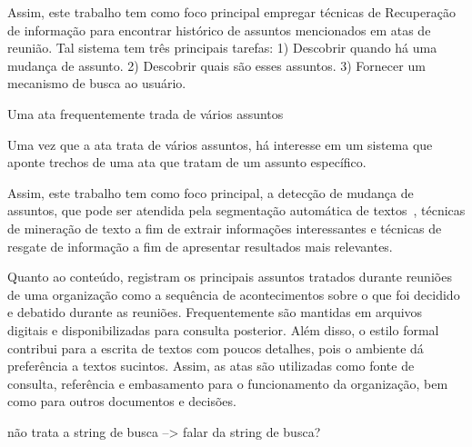 


Assim, este trabalho tem como foco principal empregar técnicas de Recuperação de informação para encontrar histórico de assuntos mencionados em atas de reunião. Tal sistema tem três principais tarefas: 
1) Descobrir quando há uma mudança de assunto. 
2) Descobrir quais são esses assuntos. 
3) Fornecer um mecanismo de busca ao usuário. 



Uma ata frequentemente trada de vários assuntos

Uma vez que a ata trata de vários assuntos, 
há interesse em um sistema que aponte trechos de uma ata que tratam de um assunto específico. 

Assim, este trabalho tem como foco principal, a detecção de mudança de assuntos, que pode ser atendida pela segmentação automática de textos~\cite{Chen2017,Naili2016,Cardoso2017}, técnicas de mineração de texto a fim de extrair informações interessantes e técnicas de resgate de informação a fim de apresentar resultados mais relevantes. 



Quanto ao conteúdo, registram os principais assuntos tratados durante reuniões de uma organização como a sequência de acontecimentos sobre o que foi decidido e debatido durante as reuniões. Frequentemente são mantidas em arquivos digitais e disponibilizadas para consulta posterior.  Além disso, o estilo formal contribui para a escrita de textos com poucos detalhes, pois o ambiente dá preferência a textos sucintos.  Assim, as atas são utilizadas como fonte de consulta, referência e embasamento para o funcionamento da organização, bem como para outros documentos e decisões.




não trata a string de busca --> falar da string de busca?


